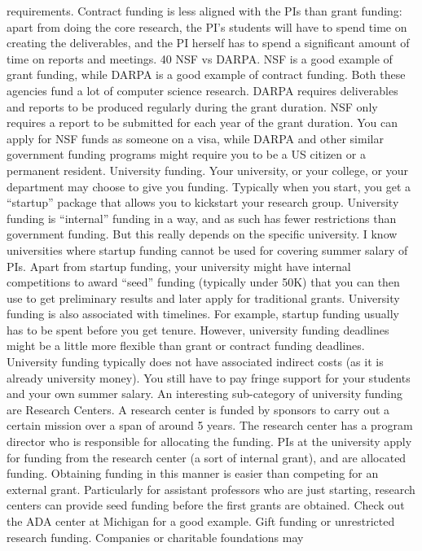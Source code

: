 \documentclass[oneside,11pt]{memoir}
\begin{document}
requirements. Contract funding is less aligned with the PIs than grant funding: apart from doing
the core research, the PI’s students will have to spend time on creating the deliverables, and the
PI herself has to spend a significant amount of time on reports and meetings.
40
NSF vs DARPA. NSF is a good example of grant funding, while DARPA is a good example of
contract funding. Both these agencies fund a lot of computer science research. DARPA requires
deliverables and reports to be produced regularly during the grant duration. NSF only requires a
report to be submitted for each year of the grant duration. You can apply for NSF funds as
someone on a visa, while DARPA and other similar government funding programs might require
you to be a US citizen or a permanent resident.
University funding. Your university, or your college, or your department may choose to give you
funding. Typically when you start, you get a “startup” package that allows you to kickstart your
research group. University funding is “internal” funding in a way, and as such has fewer
restrictions than government funding. But this really depends on the specific university. I know
universities where startup funding cannot be used for covering summer salary of PIs. Apart
from startup funding, your university might have internal competitions to award “seed” funding
(typically under 50K) that you can then use to get preliminary results and later apply for
traditional grants.
University funding is also associated with timelines. For example, startup funding usually has to
be spent before you get tenure. However, university funding deadlines might be a little more
flexible than grant or contract funding deadlines.
University funding typically does not have associated indirect costs (as it is already university
money). You still have to pay fringe support for your students and your own summer salary.
An interesting sub-category of university funding are Research Centers. A research center is
funded by sponsors to carry out a certain mission over a span of around 5 years. The research
center has a program director who is responsible for allocating the funding. PIs at the university
apply for funding from the research center (a sort of internal grant), and are allocated funding.
Obtaining funding in this manner is easier than competing for an external grant. Particularly for
assistant professors who are just starting, research centers can provide seed funding before the
first grants are obtained. Check out the ADA center at Michigan for a good example.
Gift funding or unrestricted research funding. Companies or charitable foundations may
\end{document}
